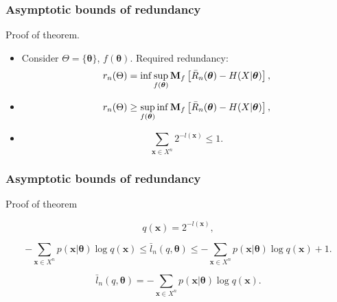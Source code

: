 \documentclass[14pt]{beamer}
\renewcommand{\vec}[1]{\ensuremath{\boldsymbol{#1}}}
\begin{document}
\begin{frame}
\frametitle{Asymptotic bounds of redundancy}
Proof of theorem.
\begin{itemize}    
    \item Consider $\Theta=\{ \vec \theta \}$, $f(\vec \theta)$. Required redundancy:
    \begin{equation}
    \label{redundancy3}
     r_n(\Theta ) = \inf \mathop {\sup }\limits_{f(\vec \theta)  }
    {\rm \bf {M}}_f \left[ {\bar {R}_n(\vec \theta)- H(X|\vec \theta) }
    \right] ,
    \end{equation}

    \item
    \begin{equation}
    \label{redundancy4}
     r_n(\Theta ) \ge  \mathop {\sup }\limits_{f(\vec \theta)  }
    \inf {\rm \bf {M}}_f \left[ \bar {R}_n(\vec \theta) - H(X|\vec
    \theta) \right] ,
    \end{equation}

    \item 
    \[
    \sum\limits_{\vec x \in X^n} {2^{ - l(\vec x)} \le 1} .
    \]
    
\end{itemize}
\end{frame}



\begin{frame}
\frametitle{Asymptotic bounds of redundancy}
Proof of theorem
\begin{itemize}    


    \item
    \[
    q(\vec x) = 2^{ - l(\vec x)},
    \]
\footnotesize{    
    \item
    \[
    - \sum_ {\vec x \in X^n} p(\vec x | \vec \theta ) \log q(\vec x)   %
    \le \bar l_n (q,\vec \theta) \le %
    - \sum_ {\vec x \in X^n} p(\vec x | \vec \theta ) \log q(\vec x)   %
    +1.
    \]
}    
    \item
    \begin{equation}
    \label{eq31_1}%
    \bar l_n (q,\vec \theta) = %
    - \sum_ {\vec x \in X^n} p(\vec x | \vec \theta ) \log q(\vec x).
    \end{equation}

\end{itemize}
\end{frame}
\end{document}
